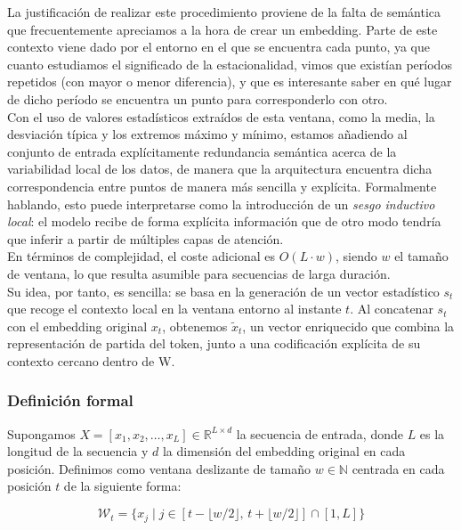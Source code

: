 La justificación de realizar este procedimiento proviene de la falta de semántica que frecuentemente apreciamos a la hora de crear un embedding. Parte de este contexto viene dado por el entorno en el que se encuentra cada punto, ya que cuanto estudiamos el significado de la estacionalidad, vimos que existían períodos repetidos (con mayor o menor diferencia), y que es interesante saber en qué lugar de dicho período se encuentra un punto para corresponderlo con otro.\\

Con el uso de valores estadísticos extraídos de esta ventana, como la media, la desviación típica y los extremos máximo y mínimo, estamos añadiendo al conjunto de entrada explícitamente redundancia semántica acerca de la variabilidad local de los datos, de manera que la arquitectura encuentra dicha correspondencia entre puntos de manera más sencilla y explícita. Formalmente hablando, esto puede interpretarse como la introducción de un \textit{sesgo inductivo local}: el modelo recibe de forma explícita información que de otro modo tendría que inferir a partir de múltiples capas de atención.\\

En términos de complejidad, el coste adicional es $O(L \cdot w)$, siendo $w$ el tamaño de ventana, lo que resulta asumible para secuencias de larga duración.\\

Su idea, por tanto, es sencilla: se basa en la generación de un vector estadístico $s_t$ que recoge el contexto local en la ventana entorno al instante $t$. Al concatenar $s_t$ con el embedding original $x_t$, obtenemos $\tilde{x}_t$, un vector enriquecido que combina la representación de partida del token, junto a una codificación explícita de su contexto cercano dentro de W.

\subsubsection{Definición formal}

Supongamos $X = [x_1, x_2, \dots, x_L] \in \mathbb{R}^{L \times d}$ la secuencia de entrada, donde $L$ es la longitud de la secuencia y $d$ la dimensión del embedding original en cada posición. Definimos como ventana deslizante de tamaño $w \in \mathbb{N}$ centrada en cada posición $t$ de la siguiente forma:

\[
\mathcal{W}_t = \{ x_j \mid j \in [t - \lfloor w/2 \rfloor,\, t + \lfloor w/2 \rfloor] \cap [1, L] \}
\]

